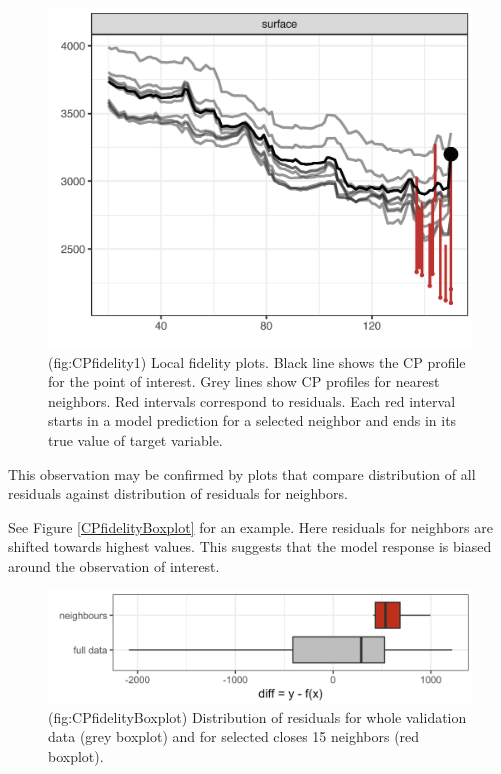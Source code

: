 \documentclass[]{book}
\theoremstyle{definition}
\theoremstyle{definition}
\theoremstyle{definition}
\theoremstyle{remark}
\begin{document}
\begin{figure}

{\centering \includegraphics[width=0.7\linewidth]{figure/cp_fidelity_1} 

}

\caption{(fig:CPfidelity1) Local fidelity plots. Black line shows the CP profile for the point of interest. Grey lines show CP profiles for nearest neighbors. Red intervals correspond to residuals. Each red interval starts in a model prediction for a selected neighbor and ends in its true value of target variable.}\label{fig:CPfidelity1}
\end{figure}

This observation may be confirmed by plots that compare distribution of
all residuals against distribution of residuals for neighbors.

See Figure \ref{CPfidelityBoxplot} for an example. Here residuals for
neighbors are shifted towards highest values. This suggests that the
model response is biased around the observation of interest.

\begin{figure}

{\centering \includegraphics[width=0.7\linewidth]{figure/cp_fidelity_boxplot} 

}

\caption{(fig:CPfidelityBoxplot) Distribution of residuals for whole validation data (grey boxplot) and for selected closes 15 neighbors (red boxplot).}\label{fig:CPfidelityBoxplot}
\end{figure}
\end{document}
